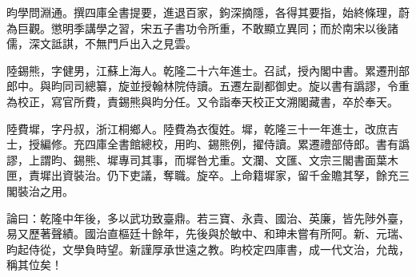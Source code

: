 \begin{pinyinscope}
昀學問淵通。撰四庫全書提要，進退百家，鉤深摘隱，各得其要指，始終條理，蔚為巨觀。懲明季講學之習，宋五子書功令所重，不敢顯立異同；而於南宋以後諸儒，深文詆諆，不無門戶出入之見雲。

陸錫熊，字健男，江蘇上海人。乾隆二十六年進士。召試，授內閣中書。累遷刑部郎中。與昀同司總纂，旋並授翰林院侍讀。五遷左副都御史。旋以書有譌謬，令重為校正，寫官所費，責錫熊與昀分任。又令詣奉天校正文溯閣藏書，卒於奉天。

陸費墀，字丹叔，浙江桐鄉人。陸費為衣復姓。墀，乾隆三十一年進士，改庶吉士，授編修。充四庫全書館總校，用昀、錫熊例，擢侍讀。累遷禮部侍郎。書有譌謬，上謂昀、錫熊、墀專司其事，而墀咎尤重。文瀾、文匯、文宗三閣書面葉木匣，責墀出資裝治。仍下吏議，奪職。旋卒。上命籍墀家，留千金贍其孥，餘充三閣裝治之用。

論曰：乾隆中年後，多以武功致臺鼎。若三寶、永貴、國治、英廉，皆先陟外臺，易又歷著聲績。國治直樞廷十餘年，先後與於敏中、和珅未嘗有所阿。新、元瑞、昀起侍從，文學負時望。新謹厚承世遠之教。昀校定四庫書，成一代文治，允哉，稱其位矣！


\end{pinyinscope}